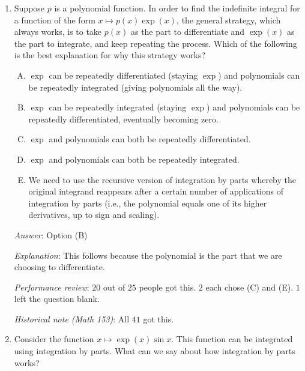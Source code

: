 \documentclass[10pt]{amsart}
\begin{document}
\begin{enumerate}
  {\em Historical note (Math 153)}: $35$ out of $41$ got this. $4$ chose (E)
  (sign error, didn't notice double negative), $2$ chose (A).

\item Suppose $p$ is a polynomial function. In order to
  find the indefinite integral for a function of the form $x
  \mapsto p(x)\exp(x)$, the general strategy, which always
  works, is to take $p(x)$ as the part to differentiate and
  $\exp(x)$ as the part to integrate, and keep repeating
  the process. Which of the following is the best explanation for why
  this strategy works?

  \begin{enumerate}[(A)]
  \item $\exp$ can be repeatedly differentiated (staying $\exp$) and
    polynomials can be repeatedly integrated (giving polynomials all
    the way).
  \item $\exp$ can be repeatedly integrated (staying $\exp$) and
    polynomials can be repeatedly differentiated, eventually becoming
    zero.
  \item $\exp$ and polynomials can both be repeatedly differentiated.
  \item $\exp$ and polynomials can both be repeatedly integrated.
  \item We need to use the recursive version of integration by parts
    whereby the original integrand reappears after a certain number of
    applications of integration by parts (i.e., the polynomial equals
    one of its higher derivatives, up to sign and scaling).
  \end{enumerate}

  {\em Answer}: Option (B)

  {\em Explanation}: This follows because the polynomial is the part
  that we are choosing to differentiate.

  {\em Performance review}: $20$ out of $25$ people got this. $2$ each
  chose (C) and (E). $1$ left the question blank.

  {\em Historical note (Math 153)}: All $41$ got this.

\item Consider the function $x \mapsto \exp(x) \sin
  x$. This function can be integrated using integration by
  parts. What can we say about how integration by parts works?


\end{enumerate}
\end{document}

